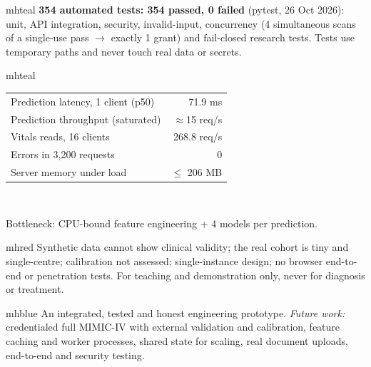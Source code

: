 \documentclass[11pt]{article}
\begin{document}
\begin{minipage}[t]{0.235\linewidth}\vspace{0pt}
\begin{pbox}[Testing]{mhteal}
\textbf{354 automated tests: 354 passed, 0 failed} (pytest, 26 Oct 2026): unit, API integration,
security, invalid-input, concurrency (4 simultaneous scans of a single-use pass $\rightarrow$ exactly 1
grant) and fail-closed research tests. Tests use temporary paths and never touch real data or secrets.
\end{pbox}
\begin{pbox}{mhteal}
\centering\small
\begin{tabular}{@{}lr@{}}
\toprule
Prediction latency, 1 client (p50) & 71.9 ms\\
Prediction throughput (saturated) & $\approx$15 req/s\\
Vitals reads, 16 clients & 268.8 req/s\\
Errors in 3{,}200 requests & 0\\
Server memory under load & $\le$ 206 MB\\
\bottomrule
\end{tabular}\\[1mm]
\raggedright Bottleneck: CPU-bound feature engineering + 4 models per prediction.
\end{pbox}
\begin{pbox}{mhred}
Synthetic data cannot show clinical validity; the real cohort is tiny and single-centre; calibration not
assessed; single-instance design; no browser end-to-end or penetration tests. For teaching and
demonstration only, never for diagnosis or treatment.
\end{pbox}
\begin{pbox}{mhblue}
An integrated, tested and honest engineering prototype. \emph{Future work:} credentialed full MIMIC-IV
with external validation and calibration, feature caching and worker processes, shared state for scaling,
real document uploads, end-to-end and security testing.
\end{pbox}
\end{minipage}
\end{document}
